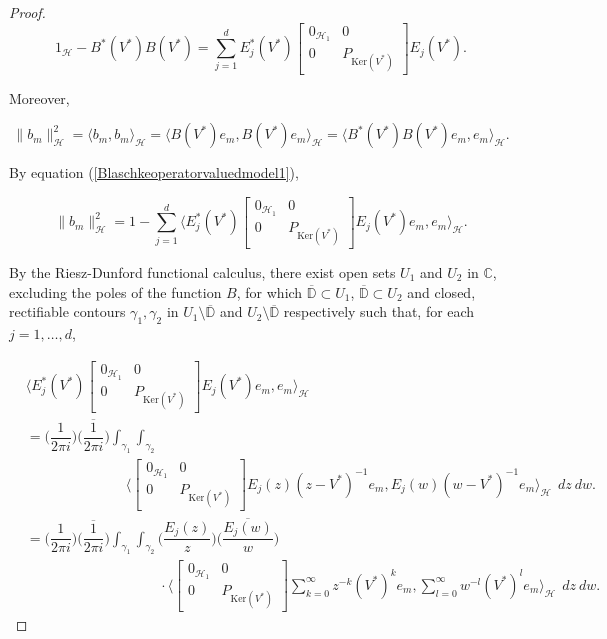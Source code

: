 \documentclass[10pt, reqno]{amsart}
\theoremstyle{definition}
\numberwithin{equation}{section}
\begin{document}
\begin{proof}
\begin{equation}\label{Blaschkeoperatorvaluedmodel1}
1_{\mathcal{H}}-B^{*}(V^{*})B(V^{*})=\sum_{j=1}^{d}E^{*}_{j}(V^{*})\begin{bmatrix}
0_{\mathcal{H}_{1}} & 0\\
0& P_{\mathrm{Ker}(V^{*})}
\end{bmatrix}E_{j}(V^{*}).
\end{equation}

\noindent Moreover,

$$\|b_{m}\|_{\mathcal{H}}^{2}=\Big\langle b_{m}, b_{m}\Big\rangle_{\mathcal{H}}
    =\Big\langle B(V^{*})e_{m}, B(V^{*})e_{m}\Big\rangle_{\mathcal{H}}
    =\Big\langle  B^{*}(V^{*})B(V^{*})e_{m},e_{m}\Big\rangle_{\mathcal{H}}.$$

\noindent By equation (\ref{Blaschkeoperatorvaluedmodel1}), 

$$\|b_{m}\|_{\mathcal{H}}^{2}= 1 - \sum_{j=1}^{d}\bigg\langle E^{*}_{j}(V^{*})\begin{bmatrix}
0_{\mathcal{H}_{1}} & 0\\
0& P_{\mathrm{Ker}(V^{*})}
\end{bmatrix}E_{j}(V^{*})e_{m},e_{m}\bigg\rangle_{\mathcal{H}}.$$

\noindent By the Riesz-Dunford functional calculus, there exist open sets $U_{1}$ and $U_{2}$ in $\mathbb{C}$, excluding the poles of the function $B$, for which $\overline{\mathbb{D}}\subset U_{1}$, $\overline{\mathbb{D}}\subset U_{2}$ and closed, rectifiable contours $\gamma_{1},\gamma_{2}$ in $U_{1}\setminus\overline{\mathbb{D}}$ and $U_{2}\setminus\overline{\mathbb{D}}$ respectively such that, for each $j=1,\hdots,d$,

\begin{align*}
&\bigg\langle E^{*}_{j}(V^{*})\begin{bmatrix}
0_{\mathcal{H}_{1}} & 0\\
0& P_{\mathrm{Ker}(V^{*})}
\end{bmatrix}E_{j}(V^{*})e_{m},e_{m}\bigg\rangle_{\mathcal{H}}\\
&=\Big(\dfrac{1}{2\pi i}\Big)\overline{\Big(\dfrac{1}{2\pi i}\Big)}\int_{\gamma_{1}}\int_{\gamma_{2}}\\
&\hspace{3cm}\bigg\langle \begin{bmatrix}
0_{\mathcal{H}_{1}} & 0\\
0& P_{\mathrm{Ker}(V^{*})}
\end{bmatrix}E_{j}(z)(z-V^{*})^{-1}e_{m},E_{j}(w)(w-V^{*})^{-1}e_{m}\bigg\rangle_{\mathcal{H}}~~dz~dw.\\
&=\Big(\dfrac{1}{2\pi i}\Big)\overline{\Big(\dfrac{1}{2\pi i}\Big)}\int_{\gamma_{1}}\int_{\gamma_{2}}\bigg(\dfrac{E_{j}(z)}{z}\bigg)\bigg(\overline{\dfrac{E_{j}(w)}{w}}\bigg)\\
&\hspace{4cm}\cdot\bigg\langle \begin{bmatrix}
0_{\mathcal{H}_{1}} & 0\\
0& P_{\mathrm{Ker}(V^{*})}
\end{bmatrix}\sum_{k=0}^{\infty}z^{-k}(V^{*})^{k}e_{m},
\sum_{l=0}^{\infty}w^{-l}(V^{*})^{l}e_{m}\bigg\rangle_{\mathcal{H}}~~dz~dw.
\end{align*}


\end{proof}
\end{document}
